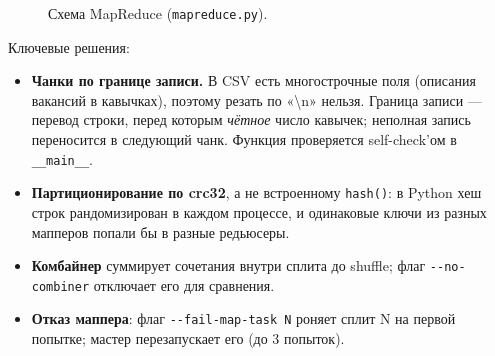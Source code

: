 \begin{figure}[H]
\centering
{}
\caption{Схема MapReduce (\texttt{mapreduce.py}).}
\end{figure}

Ключевые решения:
\begin{itemize}
\item \textbf{Чанки по границе записи.} В CSV есть многострочные поля (описания вакансий в кавычках), поэтому резать по «\textbackslash n» нельзя. Граница записи --- перевод строки, перед которым \emph{чётное} число кавычек; неполная запись переносится в следующий чанк. Функция  проверяется self-check'ом в \texttt{\_\_main\_\_}.
\item \textbf{Партиционирование по crc32}, а не встроенному \texttt{hash()}: в Python хеш строк рандомизирован в каждом процессе, и одинаковые ключи из разных мапперов попали бы в разные редьюсеры.
\item \textbf{Комбайнер} суммирует сочетания внутри сплита до shuffle; флаг \texttt{-{}-no-combiner} отключает его для сравнения.
\item \textbf{Отказ маппера}: флаг \texttt{-{}-fail-map-task N} роняет сплит N на первой попытке; мастер перезапускает его (до 3 попыток).
\end{itemize}


